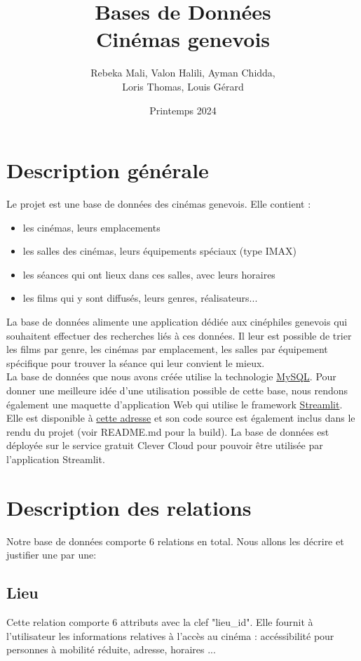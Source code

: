 \documentclass[12pt]{article}
\title{Bases de Données \\ Cinémas genevois}
\author{Rebeka Mali, Valon Halili, Ayman Chidda,\\ Loris Thomas, Louis Gérard}
\date{Printemps 2024}
\begin{document}
\maketitle
\pagebreak
\tableofcontents
\pagebreak
\section{Description générale}
Le projet est une base de données des cinémas genevois. Elle contient : 
\begin{itemize}
    \item les cinémas, leurs emplacements
    \item les salles des cinémas, leurs équipements spéciaux (type IMAX)
    \item les séances qui ont lieux dans ces salles, avec leurs horaires
    \item les films qui y sont diffusés, leurs genres, réalisateurs...
\end{itemize}
La base de données alimente une application dédiée aux cinéphiles genevois qui souhaitent
effectuer des recherches liés à ces données. Il leur est possible de trier les films par genre,
les cinémas par emplacement, les salles par équipement spécifique pour trouver la séance qui leur convient le mieux. \\
La base de données que nous avons créée utilise la technologie \href{https://www.mysql.com/}{MySQL}. Pour donner une meilleure
idée d'une utilisation possible de cette base, nous rendons également une maquette d'application Web qui utilise le framework
\href{https://streamlit.io/}{Streamlit}. Elle est disponible à \href{https://bddg7unige.streamlit.app/}{cette adresse} et son code source
est également inclus dans le rendu du projet (voir README.md pour la build). La base de données est déployée
sur le service gratuit Clever Cloud pour pouvoir être utilisée par l'application Streamlit.
\pagebreak
\section{Description des relations}
Notre base de données comporte 6 relations en total. Nous allons les décrire et justifier une par une: 
\subsection{Lieu}
Cette relation comporte 6 attributs avec la clef "lieu{\_}id". Elle fournit à l'utilisateur les informations
relatives à l'accès au cinéma : accéssibilité pour personnes à mobilité réduite, adresse, horaires ...
\end{document}
